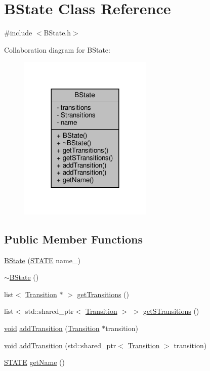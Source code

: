 \hypertarget{classBState}{}\section{B\+State Class Reference}
\label{classBState}


{\ttfamily \#include $<$B\+State.\+h$>$}



Collaboration diagram for B\+State\+:
\nopagebreak
\begin{figure}[H]
\begin{center}
\leavevmode
\includegraphics[width=180pt]{classBState__coll__graph}
\end{center}
\end{figure}
\subsection*{Public Member Functions}
\begin{DoxyCompactItemize}
\item 
\hyperlink{classBState_ab620431914f2b63b156a108cb47f9f9e}{B\+State} (\hyperlink{BState_8h_a275a67132f10277ada3a0ee3d616b647}{S\+T\+A\+TE} name\+\_\+)
\item 
\hyperlink{classBState_ab7dcf09e84afba8a5f2d1c714468ca5b}{$\sim$\+B\+State} ()
\item 
list$<$ \hyperlink{classTransition}{Transition} $\ast$ $>$ \hyperlink{classBState_a12a62f55d5136baa914a5a9296fc1a94}{get\+Transitions} ()
\item 
list$<$ std\+::shared\+\_\+ptr$<$ \hyperlink{classTransition}{Transition} $>$ $>$ \hyperlink{classBState_a3314d0c5e4a877f3b14c153e285611d9}{get\+S\+Transitions} ()
\item 
\hyperlink{imgui__impl__opengl3__loader_8h_ac668e7cffd9e2e9cfee428b9b2f34fa7}{void} \hyperlink{classBState_a19d39e24d561b72484a026a367aee031}{add\+Transition} (\hyperlink{classTransition}{Transition} $\ast$transition)
\item 
\hyperlink{imgui__impl__opengl3__loader_8h_ac668e7cffd9e2e9cfee428b9b2f34fa7}{void} \hyperlink{classBState_a2e1c33342d2a21e2c11083e0f89e1748}{add\+Transition} (std\+::shared\+\_\+ptr$<$ \hyperlink{classTransition}{Transition} $>$ transition)
\item 
\hyperlink{BState_8h_a275a67132f10277ada3a0ee3d616b647}{S\+T\+A\+TE} \hyperlink{classBState_acf259690a67bd6d34fe78f95501d5b45}{get\+Name} ()
\end{DoxyCompactItemize}
